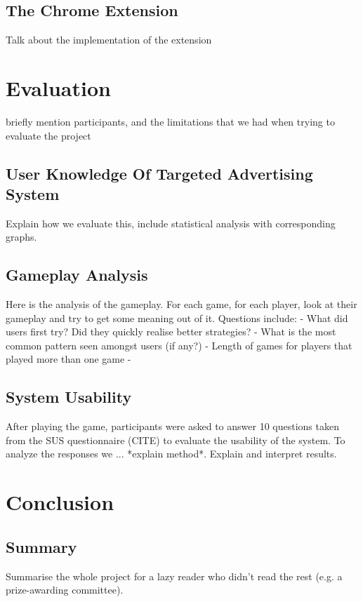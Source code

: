 \documentclass{l4proj}
\begin{document}
\section{The Chrome Extension}
Talk about the implementation of the extension


\chapter{Evaluation} 
briefly mention participants, and the limitations that we had when trying to evaluate the project

\section{User Knowledge Of Targeted Advertising System}
Explain how we evaluate this, include statistical analysis with corresponding graphs.

\section{Gameplay Analysis}
Here is the analysis of the gameplay. For each game, for each player, look at their gameplay and try to get some meaning out of it.
Questions include:
 - What did users first try? Did they quickly realise better strategies?
 - What is the most common pattern seen amongst users (if any?)
 - Length of games for players that played more than one game
 - 

\section{System Usability}
After playing the game, participants were asked to answer 10 questions taken from the SUS questionnaire (CITE) to evaluate the usability of the system. To analyze the responses we ... *explain method*. Explain and 
interpret results. 

\chapter{Conclusion}    

\section{Summary}
Summarise the whole project for a lazy reader who didn't read the rest (e.g. a prize-awarding committee).
\end{document}
